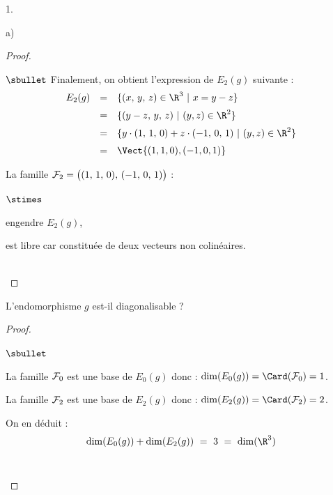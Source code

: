 \documentclass[11pt]{article}%
\begin{document}
\begin{noliste}{1.}
\begin{noliste}{a)}
\begin{proof}
\begin{noliste}{$\sbullet$}
	Finalement, on obtient l'expression de $E_2(g)$ suivante :
	\[
	  \begin{array}{rcl}
	    E_2(g) & = &  \{ (x, \, y, \, z) \in \R^3 \ | \ x=y-z \}
	    \\[.2cm]
	    & = &  \{(y-z, \, y, \, z) \ | \ (y,z) \in \R^2\}
	    \\[.2cm]
	    & = &  \{y \cdot (1, \, 1, \, 0) + z \cdot (-1, \, 0, \, 1) \ 
	    | \ (y,z) \in \R^2\}
	    \\[.2cm]
	    & = &  \Vect{(1,1,0),(-1,0,1)}
	  \end{array}
	\]
	
	La famille ${\cal F}_2 = \big( (1, \, 1, \, 0), \, (-1, \, 0,
	\, 1) \big)$ : 
	\begin{noliste}{$\stimes$}
	  \item engendre $E_2(g)$,
	  \item est libre car constituée de deux vecteurs non 
	  colinéaires.
	\end{noliste}
      \end{noliste}
      
      
      
      
      ~\\[-1.4cm]
    \end{proof}

    
    \item L'endomorphisme $g$ est-il diagonalisable ?
    
    \begin{proof}~
      \begin{noliste}{$\sbullet$}
	\item La famille ${\cal F}_0$ est une base de $E_0(g)$ donc :
	$\dim(E_0(g)) = \Card({\cal F}_0) =1$.
	
	\item La famille ${\cal F}_2$ est une base de $E_2(g)$ donc :
	$\dim(E_2(g)) = \Card({\cal F}_2) =2$.
	
	\item On en déduit :
	\[
	  \dim(E_0(g)) + \dim(E_2(g)) \ = \ 3 \ = \ \dim(\R^3)
	\]
	~\\[-1.2cm]
      \end{noliste}
    \end{proof}
  \end{noliste}
\end{noliste}
\end{document}
